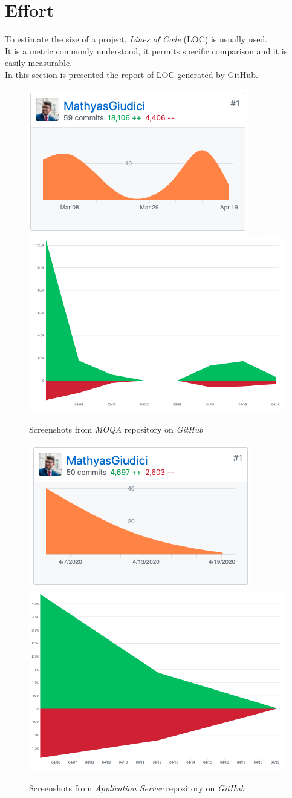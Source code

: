 \section{Effort}
To estimate the size of a project, \textit{Lines of Code} (LOC) is usually used.\\
It is a metric commonly understood, it permits specific comparison and it is easily measurable.\\

In this section is presented the report of LOC generated by GitHub.

\begin{figure}[H]
\centering
\includegraphics[width=.45\textwidth]{./img/effort/moqa-stat1.png}
\includegraphics[width=.45\textwidth]{./img/effort/moqa-stat2.png}
\hspace{0.05\linewidth}
\caption{Screenshots from \textit{MOQA} repository on \textit{GitHub}}
\label{img:moqa-stats}
\end{figure}

\begin{figure}[H]
\centering
\includegraphics[width=.45\textwidth]{./img/effort/server-stat1.png}
\includegraphics[width=.45\textwidth]{./img/effort/server-stat2.png}
\hspace{0.05\linewidth}
\caption{Screenshots from \textit{Application Server} repository on \textit{GitHub}}
\label{img:moqa-stats}
\end{figure}

